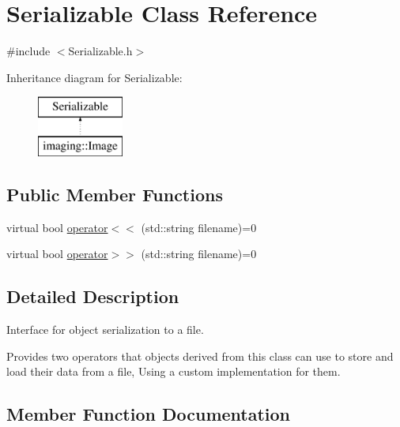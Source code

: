 \hypertarget{class_serializable}{}\section{Serializable Class Reference}
\label{class_serializable}


{\ttfamily \#include $<$Serializable.\+h$>$}

Inheritance diagram for Serializable\+:\begin{figure}[H]
\begin{center}
\leavevmode
\includegraphics[height=2.000000cm]{class_serializable}
\end{center}
\end{figure}
\subsection*{Public Member Functions}
\begin{DoxyCompactItemize}
\item 
virtual bool \hyperlink{class_serializable_a5a8ec3fd8411693715ac76b1a10386ba}{operator$<$$<$} (std\+::string filename)=0
\item 
virtual bool \hyperlink{class_serializable_a60c53d8ec7e38531699d1ca19642318d}{operator$>$$>$} (std\+::string filename)=0
\end{DoxyCompactItemize}


\subsection{Detailed Description}
Interface for object serialization to a file.

Provides two operators that objects derived from this class can use to store and load their data from a file, Using a custom implementation for them. 

\subsection{Member Function Documentation}
\mbox{\label{class_serializable_a5a8ec3fd8411693715ac76b1a10386ba}} 
